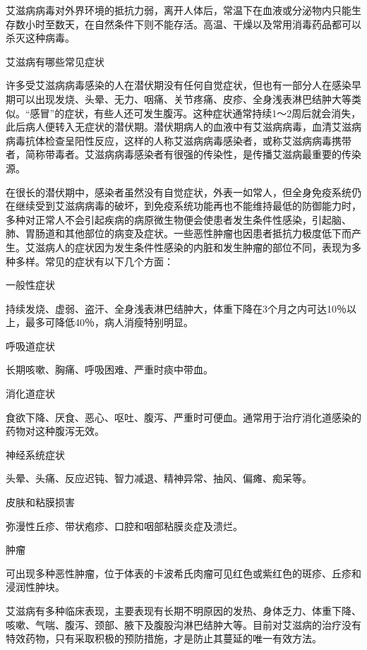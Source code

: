 \documentclass[12pt,UTF8,openany]{ctexbook}
\begin{document}
艾滋病病毒对外界环境的抵抗力弱，离开人体后，常温下在血液或分泌物内只能生存数小时至数天，在自然条件下则不能存活。高温、干燥以及常用消毒药品都可以杀灭这种病毒。





艾滋病有哪些常见症状


许多受艾滋病病毒感染的人在潜伏期没有任何自觉症状，但也有一部分人在感染早期可以出现发烧、头晕、无力、咽痛、关节疼痛、皮疹、全身浅表淋巴结肿大等类似。“感冒”的症状，有些人还可发生腹泻。这种症状通常持续1～2周后就会消失，此后病人便转入无症状的潜伏期。潜伏期病人的血液中有艾滋病病毒，血清艾滋病病毒抗体检查呈阳性反应，这样的人称艾滋病病毒感染者，或称艾滋病病毒携带者，简称带毒者。艾滋病病毒感染者有很强的传染性，是传播艾滋病最重要的传染源。

在很长的潜伏期中，感染者虽然没有自觉症状，外表一如常人，但全身免疫系统仍在继续受到艾滋病病毒的破坏，到免疫系统功能再也不能维持最低的防御能力时，多种对正常人不会引起疾病的病原微生物便会使患者发生条件性感染，引起脑、肺、胃肠道和其他部位的病变及症状。一些恶性肿瘤也因患者抵抗力极度低下而产生。艾滋病人的症状因为发生条件性感染的内脏和发生肿瘤的部位不同，表现为多种多样。常见的症状有以下几个方面：

一般性症状

持续发烧、虚弱、盗汗、全身浅表淋巴结肿大，体重下降在3个月之内可达10％以上，最多可降低40％，病人消瘦特别明显。

呼吸道症状

长期咳嗽、胸痛、呼吸困难、严重时痰中带血。

消化道症状

食欲下降、厌食、恶心、呕吐、腹泻、严重时可便血。通常用于治疗消化道感染的药物对这种腹泻无效。

神经系统症状

头晕、头痛、反应迟钝、智力减退、精神异常、抽风、偏瘫、痴呆等。

皮肤和粘膜损害

弥漫性丘疹、带状疱疹、口腔和咽部粘膜炎症及溃烂。

肿瘤

可出现多种恶性肿瘤，位于体表的卡波希氏肉瘤可见红色或紫红色的斑疹、丘疹和浸润性肿块。

艾滋病有多种临床表现，主要表现有长期不明原因的发热、身体乏力、体重下降、咳嗽、气喘、腹泻、颈部、腋下及腹股沟淋巴结肿大等。目前对艾滋病的治疗没有特效药物，只有采取积极的预防措施，才是防止其蔓延的唯一有效方法。
\end{document}
